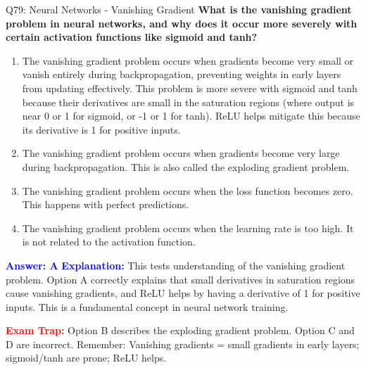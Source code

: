 \documentclass[8pt]{beamer}
\begin{document}
	\begin{frame}{Q79: Neural Networks - Vanishing Gradient}
		\fontsize{6.5}{7.5}\selectfont
		\textbf{What is the vanishing gradient problem in neural networks, and why does it occur more severely with certain activation functions like sigmoid and tanh?}
		
		\begin{enumerate}
			\item The vanishing gradient problem occurs when gradients become very small or vanish entirely during backpropagation, preventing weights in early layers from updating effectively. This problem is more severe with sigmoid and tanh because their derivatives are small in the saturation regions (where output is near 0 or 1 for sigmoid, or -1 or 1 for tanh). ReLU helps mitigate this because its derivative is 1 for positive inputs.
			\item The vanishing gradient problem occurs when gradients become very large during backpropagation. This is also called the exploding gradient problem.
			\item The vanishing gradient problem occurs when the loss function becomes zero. This happens with perfect predictions.
			\item The vanishing gradient problem occurs when the learning rate is too high. It is not related to the activation function.
		\end{enumerate}
		
		\vspace{0.1cm}
		\textcolor{blue}{\textbf{Answer: A}}
		\vspace{0.1cm}
		\textcolor{blue}{\textbf{Explanation:}} This tests understanding of the vanishing gradient problem. Option A correctly explains that small derivatives in saturation regions cause vanishing gradients, and ReLU helps by having a derivative of 1 for positive inputs. This is a fundamental concept in neural network training.
		
		\textcolor{red}{\textbf{Exam Trap:}} Option B describes the exploding gradient problem. Option C and D are incorrect. Remember: Vanishing gradients = small gradients in early layers; sigmoid/tanh are prone; ReLU helps.
	\end{frame}
	
\end{document}
